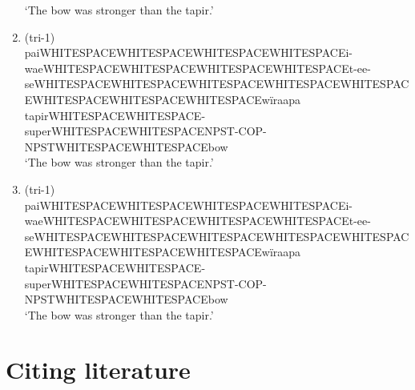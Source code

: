 \documentclass{article}
\begin{document}
\begin{enumerate}
  `The bow was stronger than the tapir.'
\item
  (tri-1)\\
  pai\textbar WHITESPACE\textbar\textbar WHITESPACE\textbar\textbar WHITESPACE\textbar\textbar WHITESPACE\textbar i-wae\textbar WHITESPACE\textbar\textbar WHITESPACE\textbar\textbar WHITESPACE\textbar\textbar WHITESPACE\textbar t-ee-se\textbar WHITESPACE\textbar\textbar WHITESPACE\textbar\textbar WHITESPACE\textbar\textbar WHITESPACE\textbar\textbar WHITESPACE\textbar\textbar WHITESPACE\textbar\textbar WHITESPACE\textbar\textbar WHITESPACE\textbar wïraapa\\
  tapir\textbar WHITESPACE\textbar\textbar WHITESPACE-super\textbar WHITESPACE\textbar\textbar WHITESPACE\textbar NPST-COP-NPST\textbar WHITESPACE\textbar\textbar WHITESPACE\textbar bow\\
  `The bow was stronger than the tapir.'
\item
  (tri-1)\\
  pai\textbar WHITESPACE\textbar\textbar WHITESPACE\textbar\textbar WHITESPACE\textbar\textbar WHITESPACE\textbar i-wae\textbar WHITESPACE\textbar\textbar WHITESPACE\textbar\textbar WHITESPACE\textbar\textbar WHITESPACE\textbar t-ee-se\textbar WHITESPACE\textbar\textbar WHITESPACE\textbar\textbar WHITESPACE\textbar\textbar WHITESPACE\textbar\textbar WHITESPACE\textbar\textbar WHITESPACE\textbar\textbar WHITESPACE\textbar\textbar WHITESPACE\textbar wïraapa\\
  tapir\textbar WHITESPACE\textbar\textbar WHITESPACE-super\textbar WHITESPACE\textbar\textbar WHITESPACE\textbar NPST-COP-NPST\textbar WHITESPACE\textbar\textbar WHITESPACE\textbar bow\\
  `The bow was stronger than the tapir.'
\end{enumerate}

\section{\texorpdfstring{Citing literature
\label{sec:sources}}{Citing literature }}
\end{document}
